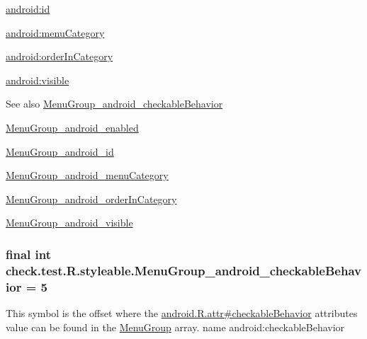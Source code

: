 {\ttfamily \hyperlink{classcheck_1_1test_1_1_r_1_1styleable_a46daffdbc2d6252d224472748228ac3c}{android\+:id}}

{\ttfamily \hyperlink{classcheck_1_1test_1_1_r_1_1styleable_ab4abe6642c85e78a9af64e1d520a3856}{android\+:menu\+Category}}

{\ttfamily \hyperlink{classcheck_1_1test_1_1_r_1_1styleable_affb54491da972771b15dfc93ab8267f6}{android\+:order\+In\+Category}}

{\ttfamily \hyperlink{classcheck_1_1test_1_1_r_1_1styleable_a329149f9ef5c82c8f8ddfde35c9d9e05}{android\+:visible}}

\begin{DoxySeeAlso}{See also}
\hyperlink{classcheck_1_1test_1_1_r_1_1styleable_ad0fe31daacd1ba191fff33b4f294c242}{Menu\+Group\+\_\+android\+\_\+checkable\+Behavior} 

\hyperlink{classcheck_1_1test_1_1_r_1_1styleable_a4181140c18864b52c09f5f001c0f9cba}{Menu\+Group\+\_\+android\+\_\+enabled} 

\hyperlink{classcheck_1_1test_1_1_r_1_1styleable_a46daffdbc2d6252d224472748228ac3c}{Menu\+Group\+\_\+android\+\_\+id} 

\hyperlink{classcheck_1_1test_1_1_r_1_1styleable_ab4abe6642c85e78a9af64e1d520a3856}{Menu\+Group\+\_\+android\+\_\+menu\+Category} 

\hyperlink{classcheck_1_1test_1_1_r_1_1styleable_affb54491da972771b15dfc93ab8267f6}{Menu\+Group\+\_\+android\+\_\+order\+In\+Category} 

\hyperlink{classcheck_1_1test_1_1_r_1_1styleable_a329149f9ef5c82c8f8ddfde35c9d9e05}{Menu\+Group\+\_\+android\+\_\+visible} 
\end{DoxySeeAlso}
\hypertarget{classcheck_1_1test_1_1_r_1_1styleable_ad0fe31daacd1ba191fff33b4f294c242}{}
\subsubsection[{Menu\+Group\+\_\+android\+\_\+checkable\+Behavior}]{\setlength{\rightskip}{0pt plus 5cm}final int check.\+test.\+R.\+styleable.\+Menu\+Group\+\_\+android\+\_\+checkable\+Behavior = 5\hspace{0.3cm}{\ttfamily [static]}}\label{classcheck_1_1test_1_1_r_1_1styleable_ad0fe31daacd1ba191fff33b4f294c242}
This symbol is the offset where the \hyperlink{}{android.\+R.\+attr\#checkable\+Behavior} attribute\textquotesingle{}s value can be found in the \hyperlink{classcheck_1_1test_1_1_r_1_1styleable_a95a67e0fb4cd8754aea3728538c936cf}{Menu\+Group} array.  name android\+:checkable\+Behavior \hypertarget{classcheck_1_1test_1_1_r_1_1styleable_a4181140c18864b52c09f5f001c0f9cba}{}
